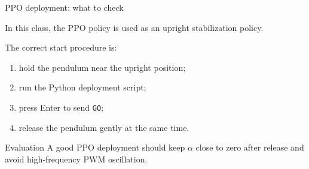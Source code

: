 \documentclass[aspectratio=169]{beamer}
\begin{document}
\begin{frame}{PPO deployment: what to check}

In this class, the PPO policy is used as an upright stabilization policy.

\vspace{0.15cm}

The correct start procedure is:

\begin{enumerate}
    \item hold the pendulum near the upright position;
    \vspace{0.16cm}

    \item run the Python deployment script;
    \vspace{0.16cm}

    \item press Enter to send \texttt{GO};
    \vspace{0.16cm}

    \item release the pendulum gently at the same time.
\end{enumerate}

\vspace{0.15cm}

\begin{block}{Evaluation}
\small
A good PPO deployment should keep \(\alpha\) close to zero after release and avoid high-frequency PWM oscillation.
\end{block}

\end{frame}
\end{document}
